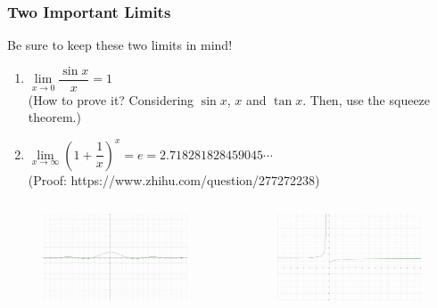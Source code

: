 \begin{frame}
	\frametitle{Two Important Limits}
	Be sure to keep these two limits in mind!
	\begin{enumerate}
		\item $\lim\limits_{\textit{x} \to 0}\dfrac{\sin{x}}{x} = 1$\\
		      (How to prove it? Considering $\sin{x}$, $x$ and $\tan{x}$. Then, use the squeeze theorem.)
		\item $\lim\limits_{\textit{x} \to \infty}(1 + \dfrac{1}{x})^{x} = e = 2.718281828459045\cdots$ \\
		      (Proof: https://www.zhihu.com/question/277272238)

	\end{enumerate}
	\begin{columns}[c] %
		\begin{column}{0.5\textwidth} %
			\begin{figure}
				\includegraphics[width=1\linewidth]{res/bbb.jpg}
			\end{figure}
		\end{column}
		\begin{column}{0.5\textwidth} %
			\begin{figure}
				\includegraphics[width=1\linewidth]{res/aaa.jpg}
			\end{figure}
		\end{column}
	\end{columns}
\end{frame}


